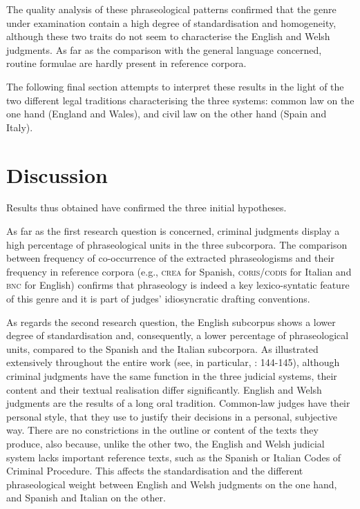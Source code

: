 \documentclass[output=paper]{LSP/langsci}
\begin{document}
The quality analysis of these phraseological patterns \citep[255--261]{
Pontrandolfo2013b} confirmed that the genre under examination contain a high degree of standardisation and homogeneity, although these two traits do not seem to characterise the English and Welsh judgments. As far as the comparison with the general language concerned, routine formulae are hardly present in reference corpora.

The following final section attempts to interpret these results in the light of the two different legal traditions characterising the three systems: common law on the one hand (England and Wales), and civil law on the other hand (Spain and Italy).

\section{Discussion} \label{sec:6:7}
Results thus obtained have confirmed the three initial hypotheses.

As far as the first research question is concerned, criminal judgments display a high percentage of phraseological units in the three subcorpora. The comparison between frequency of co-occurrence of the extracted phraseologisms and their frequency in reference corpora (e.g., \textsc{crea} for Spanish, \textsc{coris}/\textsc{codis} for Italian and \textsc{bnc} for English) confirms that phraseology is indeed a key lexico-syntatic feature of this genre and it is part of judges’ idiosyncratic drafting conventions.
 
As regards the second research question, the English subcorpus shows a lower degree of standardisation and, consequently, a lower percentage of phraseological units, compared to the Spanish and the Italian subcorpora. As illustrated extensively throughout the entire work (see, in particular, \citealt{Pontrandolfo2013a}: 144-145), although criminal judgments have the same function in the three judicial systems, their content and their textual realisation differ significantly. English and Welsh judgments are the results of a long oral tradition. Common-law judges have their personal style, that they use to justify their decisions in a personal, subjective way. There are no constrictions in the outline or content of the texts they produce, also because, unlike the other two, the English and Welsh judicial system lacks important reference texts, such as the Spanish or Italian Codes of Criminal Procedure. This affects the standardisation and the different phraseological weight between English and Welsh judgments on the one hand, and Spanish and Italian on the other.
\end{document}

